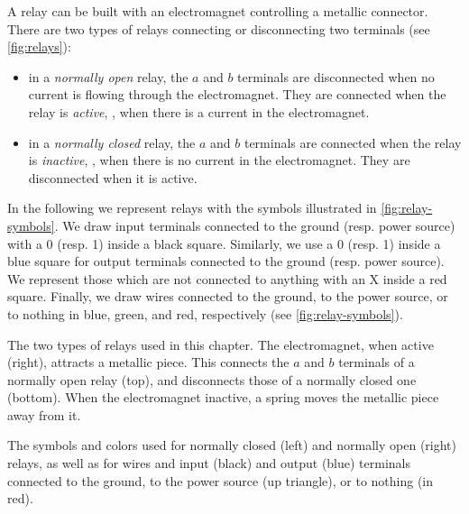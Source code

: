 A relay can be built with an electromagnet controlling a metallic connector.
There are two types of relays connecting or disconnecting two terminals (see
\cref{fig:relays}):
\begin{itemize}
  \item in a {\em normally open} relay, the $a$ and $b$ terminals are
  disconnected when no current is flowing through the electromagnet. They are
  connected when the relay is {\em active}, \ie, when there is a current in the
  electromagnet.

  \item in a {\em normally closed} relay, the $a$ and $b$ terminals are
  connected when the relay is {\em inactive}, \ie, when there is no current in
  the electromagnet. They are disconnected when it is active.
\end{itemize}

In the following we represent relays with the symbols illustrated in
\cref{fig:relay-symbols}. We draw input terminals connected to the ground
(resp. power source) with a 0 (resp. 1) inside a black square. Similarly, we
use a 0 (resp. 1) inside a blue square for output terminals connected to the
ground (resp. power source). We represent those which are not connected to
anything with an X inside a red square. Finally, we draw wires connected to the
ground, to the power source, or to nothing in blue, green, and red,
respectively (see \cref{fig:relay-symbols}).

\begin{Figure}
  

  \caption{The two types of relays used in this chapter. The electromagnet,
  when active (right), attracts a metallic piece. This connects the $a$ and $b$
  terminals of a normally open relay (top), and disconnects those of a normally
  closed one (bottom). When the electromagnet inactive, a spring moves the
  metallic piece away from it.}\label{fig:relays}
\end{Figure}

\begin{Figure}
  

  \caption{The symbols and colors used for normally closed (left) and normally
  open (right) relays, as well as for wires and input (black) and output (blue)
  terminals connected to the ground, to the power source (up triangle), or to
  nothing (in red).}\label{fig:relay-symbols}
\end{Figure}

